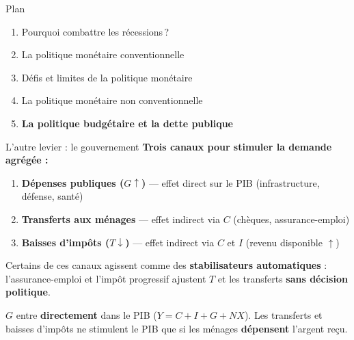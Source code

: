 \documentclass[aspectratio=169]{beamer}
\begin{document}

\begin{frame}{Plan}
   \begin{enumerate}
      \setlength\itemsep{0.5cm}
      \item {\color{gray!50}Pourquoi combattre les récessions\,?}
      \item {\color{gray!50}La politique monétaire conventionnelle}
      \item {\color{gray!50}Défis et limites de la politique monétaire}
      \item {\color{gray!50}La politique monétaire non conventionnelle}
      \item \textbf{La politique budgétaire et la dette publique}
   \end{enumerate}
\end{frame}


\begin{frame}[t]{L'autre levier : le gouvernement}\examtag
   \small
   \textbf{Trois canaux pour stimuler la demande agrégée :}
   \vspace{0.2cm}
   \begin{enumerate}
      \setlength\itemsep{0.2cm}
      \item \textbf{Dépenses publiques ($G \uparrow$)} --- effet direct sur le PIB (infrastructure, défense, santé)
      \item \textbf{Transferts aux ménages} --- effet indirect via $C$ (chèques, assurance-emploi)
      \item \textbf{Baisses d'impôts ($T \downarrow$)} --- effet indirect via $C$ et $I$ (revenu disponible $\uparrow$)
   \end{enumerate}
   \vspace{0.2cm}
   Certains de ces canaux agissent comme des \textbf{stabilisateurs automatiques} : l'assurance-emploi et l'impôt progressif ajustent $T$ et les transferts \textbf{sans décision politique}.
   \vspace{0.15cm}
   \begin{keyinsight}
      $G$ entre \textbf{directement} dans le PIB ($Y = C + I + G + NX$). Les transferts et baisses d'impôts ne stimulent le PIB que si les ménages \textbf{dépensent} l'argent reçu.
   \end{keyinsight}
\end{frame}
\end{document}
